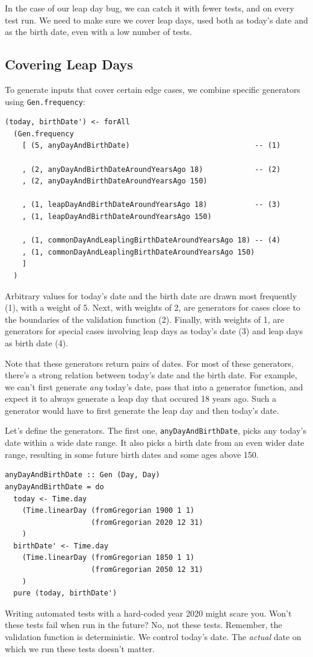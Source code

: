 In the case of our leap day bug, we can catch it with fewer tests, and
on every test run. We need to make sure we cover leap days, used both as
today's date and as the birth date, even with a low number of tests.

\subsection{Covering Leap Days}
\label{covering-leap-days}

To generate inputs that cover certain edge cases, we combine specific
generators using \texttt{Gen.frequency}:

\begin{verbatim}
(today, birthDate') <- forAll
  (Gen.frequency
    [ (5, anyDayAndBirthDate)                             -- (1)

    , (2, anyDayAndBirthDateAroundYearsAgo 18)            -- (2)
    , (2, anyDayAndBirthDateAroundYearsAgo 150)

    , (1, leapDayAndBirthDateAroundYearsAgo 18)           -- (3) 
    , (1, leapDayAndBirthDateAroundYearsAgo 150)

    , (1, commonDayAndLeaplingBirthDateAroundYearsAgo 18) -- (4)
    , (1, commonDayAndLeaplingBirthDateAroundYearsAgo 150)
    ]
  )
\end{verbatim}
Arbitrary values for today's date and the birth date are drawn most
frequently (1), with a weight of 5. Next, with weights of 2, are
generators for cases close to the boundaries of the validation function
(2). Finally, with weights of 1, are generators for special cases
involving leap days as today's date (3) and leap days as birth date (4).

Note that these generators return pairs of dates. For most of these
generators, there's a strong relation between today's date and the birth
date. For example, we can't first generate \emph{any} today's date, pass
that into a generator function, and expect it to always generate a leap
day that occured 18 years ago. Such a generator would have to first
generate the leap day and then today's date.

Let's define the generators. The first one, \texttt{anyDayAndBirthDate},
picks any today's date within a wide date range. It also picks a birth
date from an even wider date range, resulting in some future birth dates
and some ages above 150.

\begin{verbatim}
anyDayAndBirthDate :: Gen (Day, Day)
anyDayAndBirthDate = do
  today <- Time.day
    (Time.linearDay (fromGregorian 1900 1 1)
                    (fromGregorian 2020 12 31)
    )
  birthDate' <- Time.day
    (Time.linearDay (fromGregorian 1850 1 1)
                    (fromGregorian 2050 12 31)
    )
  pure (today, birthDate')
\end{verbatim}
Writing automated tests with a hard-coded year 2020 might scare you.
Won't these tests fail when run in the future? No, not these tests.
Remember, the validation function is deterministic. We control today's
date. The \emph{actual} date on which we run these tests doesn't matter.

